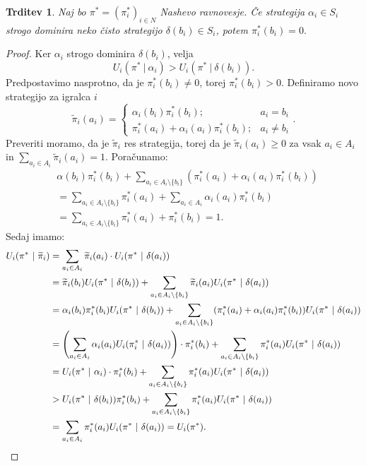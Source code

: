 \documentclass[10pt, a4paper]{article}
\newtheorem{trditev}[izr]{Trditev}
\newenvironment{noticeC}{%
  \tcolorbox[%
  notitle,
  empty,
  enhanced,  %
  breakable,
  coltext=black, 
  fontupper=\rmfamily,
  noparskip,
  sharp corners,
  boxrule=-1pt,  %
  frame hidden,
  left=7pt,  %
  right=7pt,
  top=5pt,
  bottom=5pt,
  before skip=2.5ex plus 2pt,
  after skip=2.5ex plus 2pt,
  overlay unbroken and last={%
  },
  ]}
{\endtcolorbox}
\newenvironment{dokaz}%
  {\begin{noticeC}\begin{proof}}%
  {\end{proof}\end{noticeC}}
\begin{document}
\begin{trditev}
  Naj bo $\pi^* = (\pi_i^*)_{i \in N}$ Nashevo ravnovesje.
  Če strategija $\alpha_i \in S_i$ strogo dominira neko čisto strategijo 
  $\delta(b_i) \in S_i$, potem $\pi_i^* (b_i) = 0.$
\end{trditev}

\begin{dokaz}
  Ker $\alpha_i$ strogo dominira $\delta(b_i)$, velja 
  $$U_i (\pi^*\ |\ \alpha_i) > U_i (\pi^*\ |\ \delta(b_i)).$$
  Predpostavimo nasprotno, da je $\pi_i^* (b_i) \neq 0$, torej $\pi_i^* (b_i) > 0$.
  Definiramo novo strategijo za igralca $i$
  $$\widetilde{\pi}_i (a_i) = \begin{cases}
    \alpha_i (b_i) \pi_i^*(b_i); & a_i = b_i\\
    \pi^* _i (a_i) + \alpha_i (a_i) \pi^*_i (b_i); & a_i \neq b_i
  \end{cases}.$$
  Preveriti moramo, da je $\widetilde{\pi}_i $ res strategija, torej da je $\widetilde{\pi}_i (a_i) \geq 0$ za vsak $a_i \in A_i$ in 
  $\sum_{a_i \in A_i} \widetilde{\pi}_i (a_i) = 1.$
  Poračunamo:
  \begin{align*}
    &\alpha(b_i) \pi_i^* (b_i) + \sum_{a_i \in A_i \setminus \{b_i\}} \left(\pi_i^* (a_i) + \alpha_i (a_i) \pi_i^* (b_i)\right)\\
    &= \sum_{a_i \in A_i \setminus \{b_i\}} \pi_i^* (a_i) + \sum_{a_i \in A_i} \alpha_i (a_i) \pi_i^* (b_i)\\
    &= \sum_{a_i \in A_i \setminus \{b_i\}} \pi_i^* (a_i) + \pi_i^* (b_i) = 1.
  \end{align*} 
  Sedaj imamo:
  \begin{align*}
    U_i (\pi^*\ |\ \widetilde{\pi}_i) &= \sum_{a_i \in A_i} \widetilde{\pi}_i (a_i) \cdot U_i (\pi^*\ |\ \delta(a_i))\\
    &= \widetilde{\pi}_i (b_i) U_i (\pi^*\ |\ \delta(b_i)) + \sum_{a_i \in A_i \setminus \{b_i\}} \widetilde{\pi}_i (a_i) U_i (\pi^*\ |\ \delta (a_i))\\
    &= \alpha_i (b_i) \pi_i ^* (b_i) U_i (\pi^*\ |\ \delta(b_i)) + \sum_{a_i \in A_i \setminus \{b_i\}} (\pi_i ^* (a_i) + \alpha_i(a_i) \pi_i^*(b_i)) U_i (\pi^*\ |\ \delta (a_i))\\
    &= \left( \sum_{a_i \in A_i} \alpha_i (a_i) U_i (\pi_i ^*\ |\ \delta(a_i)) \right) \cdot \pi_i^* (b_i) + \sum_{a_i \in A_i \setminus \{b_i\}} \pi_i^* (a_i) U_i (\pi^*\ |\ \delta(a_i))\\
    &= U_i (\pi^*\ |\ \alpha_i) \cdot \pi_i ^* (b_i) + \sum_{a_i \in A_i \setminus \{b_i\}} \pi_i^* (a_i) U_i (\pi^*\ |\ \delta(a_i))\\
    &> U_i (\pi^*\ |\ \delta(b_i)) \pi_i ^* (b_i) + \sum_{a_i \in A_i \setminus \{b_i\}} \pi_i^* (a_i) U_i (\pi^*\ |\ \delta(a_i))\\
    &= \sum_{a_i \in A_i} \pi_i^* (a_i) U_i (\pi^*\ |\ \delta(a_i)) = U_i (\pi^*). \qedhere
  \end{align*}
\end{dokaz}
\end{document}
